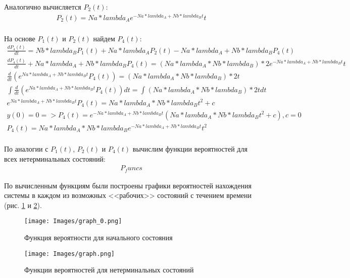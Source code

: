 Аналогично вычисляется $P_2 (t)$:
\begin{gather*}
    P_2(t) = {{ Na * lambda_A }} e^{- {{ Na * lambda_A + Nb * lambda_B }} t}t\\
\end{gather*}

На основе $P_1 (t)$ и $P_2 (t)$ найдем $P_4 (t)$:
\begin{gather*}
    \frac{d P_4(t)}{dt} = {{ Nb * lambda_B }} P_1 (t) + {{ Na * lambda_A }} P_2 (t) - {{ Na * lambda_A + Nb * lambda_B }} P_4(t)\\
    \frac{d P_4(t)}{dt} + {{ Na * lambda_A + Nb * lambda_B }} P_4(t) = {{ (Na * lambda_A * Nb * lambda_B) * 2 }} e^{- {{ Na * lambda_A + Nb * lambda_B }} t} t\\
    \frac{d}{dt} (e^{ {{ Na * lambda_A + Nb * lambda_B }} t} P_4(t)) = {{ (Na * lambda_A * Nb * lambda_B) * 2 }} t\\
    \int \frac{d}{dt} (e^{ {{ Na * lambda_A + Nb * lambda_B }} t} P_4(t)) dt = \int {{ (Na * lambda_A * Nb * lambda_B) * 2 }} t dt\\
    e^{ {{ Na * lambda_A + Nb * lambda_B }} t} P_4(t) = {{ Na * lambda_A * Nb * lambda_B }} t^2 + c \\
    y(0) = 0 => P_4(t) = e^{ -{{ Na * lambda_A + Nb * lambda_B }} t} ( {{ Na * lambda_A * Nb * lambda_B }} t^2 + c), c = 0 \\
    P_4(t) = {{ Na * lambda_A * Nb * lambda_B }} e^{ -{{ Na * lambda_A + Nb * lambda_B }} t} t^2\\
\end{gather*}

\newpage
По аналогии с $P_1 (t)$, $P_2 (t)$ и $P_4 (t)$ вычислим функции вероятностей для всех нетерминальных состояний:
\begin{gather*}
    {{ P_funcs }}
\end{gather*}

По вычисленным функциям были построены графики вероятностей нахождения системы в каждом из возможных <<рабочих>> состояний с течением времени (рис. \ref{P_0} и \ref{P_i}).
\begin{figure}[H]
\centerline{\texttt{[image: Images/graph\_0.png]}}
\caption{Функция вероятности для начального состояния}
\label{P_0}
\end{figure}

\begin{figure}[H]
\centerline{\texttt{[image: Images/graph.png]}}
\caption{Функции вероятностей для нетерминальных состояний}
\label{P_i}
\end{figure}

